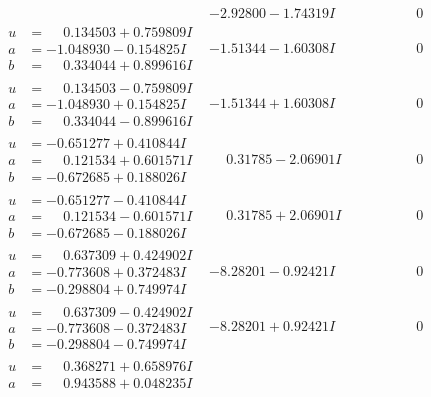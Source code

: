 \documentclass[1p]{elsarticle_modified}
\theoremstyle{definition}
\begin{document}
$$\begin{array}{c|c|c}
 & -2.92800 - 1.74319 I & \phantom{-0.000000 } 0 \\ \hline\begin{aligned}
u &= \phantom{-}0.134503 + 0.759809 I \\
a &= -1.048930 - 0.154825 I \\
b &= \phantom{-}0.334044 + 0.899616 I\end{aligned}
 & -1.51344 - 1.60308 I & \phantom{-0.000000 } 0 \\ \hline\begin{aligned}
u &= \phantom{-}0.134503 - 0.759809 I \\
a &= -1.048930 + 0.154825 I \\
b &= \phantom{-}0.334044 - 0.899616 I\end{aligned}
 & -1.51344 + 1.60308 I & \phantom{-0.000000 } 0 \\ \hline\begin{aligned}
u &= -0.651277 + 0.410844 I \\
a &= \phantom{-}0.121534 + 0.601571 I \\
b &= -0.672685 + 0.188026 I\end{aligned}
 & \phantom{-}0.31785 - 2.06901 I & \phantom{-0.000000 } 0 \\ \hline\begin{aligned}
u &= -0.651277 - 0.410844 I \\
a &= \phantom{-}0.121534 - 0.601571 I \\
b &= -0.672685 - 0.188026 I\end{aligned}
 & \phantom{-}0.31785 + 2.06901 I & \phantom{-0.000000 } 0 \\ \hline\begin{aligned}
u &= \phantom{-}0.637309 + 0.424902 I \\
a &= -0.773608 + 0.372483 I \\
b &= -0.298804 + 0.749974 I\end{aligned}
 & -8.28201 - 0.92421 I & \phantom{-0.000000 } 0 \\ \hline\begin{aligned}
u &= \phantom{-}0.637309 - 0.424902 I \\
a &= -0.773608 - 0.372483 I \\
b &= -0.298804 - 0.749974 I\end{aligned}
 & -8.28201 + 0.92421 I & \phantom{-0.000000 } 0 \\ \hline\begin{aligned}
u &= \phantom{-}0.368271 + 0.658976 I \\
a &= \phantom{-}0.943588 + 0.048235 I \\

\end{aligned}
\end{array}$$
\end{document}
